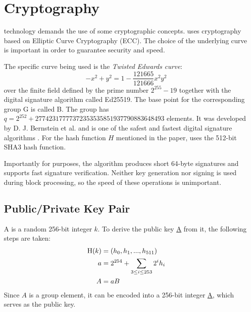 \section{Cryptography}
\label{sec:cryptography}


 technology demands the use of some cryptographic concepts.
\codenamespace uses cryptography based on Elliptic Curve Cryptography (ECC).
The choice of the underlying curve is important in order to guarantee security and speed.

The specific curve being used is the \emph{Twisted Edwards curve}:
$$ -x^2 + y^2 = 1 - \frac{121665}{121666} x^2 y^2$$
over the finite field defined by the prime number $2^{255}-19$ together with the digital signature algorithm called Ed25519.
The base point for the corresponding group G is called B. The group has $q=2^{252} + 27742317777372353535851937790883648493$ elements.
It was developed by D. J. Bernstein et al. and is one of the safest and fastest digital signature algorithms \cite{Bernstein2011}.
For the hash function $H$ mentioned in the paper, \codenamespace uses the 512-bit SHA3 hash function.

Importantly for \codenamespace purposes, the algorithm produces short 64-byte signatures and supports fast signature verification.
Neither key generation nor signing is used during block processing, so the speed of these operations is unimportant.

\subsection{Public/Private Key Pair}

A  is a random 256-bit integer $k$. To derive the public key \underline{A} from it, the following steps are taken:
\begin{align}
\operatorname{H}(k) &=(h_0, h_1,..., h_{511}) \\
a &= 2^{254} + \sum_{3\leq i \leq 253} 2^i h_i \\
A &= aB
\end{align}
Since $A$ is a group element, it can be encoded into a 256-bit integer \underline{A}, which serves as the public key.

